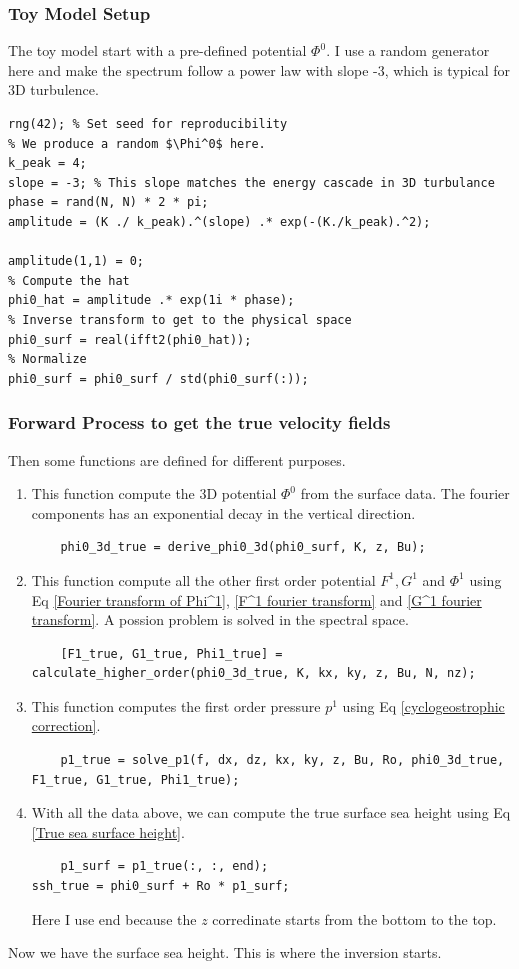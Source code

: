 \documentclass[../SQG_notes.tex]{subfiles}
\begin{document}
\subsubsection{Toy Model Setup}
The toy model start with a pre-defined potential $\Phi^0$. I use a random generator here and make the spectrum follow a power law with slope -3, which is typical for 3D turbulence. 
\begin{lstlisting}
rng(42); % Set seed for reproducibility
% We produce a random $\Phi^0$ here. 
k_peak = 4;
slope = -3; % This slope matches the energy cascade in 3D turbulance
phase = rand(N, N) * 2 * pi;
amplitude = (K ./ k_peak).^(slope) .* exp(-(K./k_peak).^2);

amplitude(1,1) = 0;
% Compute the hat
phi0_hat = amplitude .* exp(1i * phase);
% Inverse transform to get to the physical space
phi0_surf = real(ifft2(phi0_hat));
% Normalize
phi0_surf = phi0_surf / std(phi0_surf(:));
\end{lstlisting}

\subsubsection{Forward Process to get the true velocity fields}
Then some functions are defined for different purposes.
\begin{enumerate}
    \item This function compute the 3D potential $\Phi^0$ from the surface data. The fourier components has an exponential decay in the vertical direction.
    \begin{lstlisting}
    phi0_3d_true = derive_phi0_3d(phi0_surf, K, z, Bu);
    \end{lstlisting}
    \item This function compute all the other first order potential $F^1, G^1$ and $\Phi^1$ using Eq \ref{Fourier transform of Phi^1}, \ref{F^1 fourier transform} and \ref{G^1 fourier transform}. A possion problem is solved in the spectral space.
    \begin{lstlisting}
    [F1_true, G1_true, Phi1_true] = calculate_higher_order(phi0_3d_true, K, kx, ky, z, Bu, N, nz);
    \end{lstlisting}
    \item This function computes the first order pressure $p^1$ using Eq \ref{cyclogeostrophic correction}.
    \begin{lstlisting}
    p1_true = solve_p1(f, dx, dz, kx, ky, z, Bu, Ro, phi0_3d_true, F1_true, G1_true, Phi1_true);
    \end{lstlisting}
    \item With all the data above, we can compute the true surface sea height using Eq \ref{True sea surface height}.
    \begin{lstlisting}
    p1_surf = p1_true(:, :, end);
ssh_true = phi0_surf + Ro * p1_surf;
    \end{lstlisting}
    Here I use end because the $z$ corredinate starts from the bottom to the top. 
\end{enumerate}
Now we have the surface sea height. This is where the inversion starts.
\end{document}
